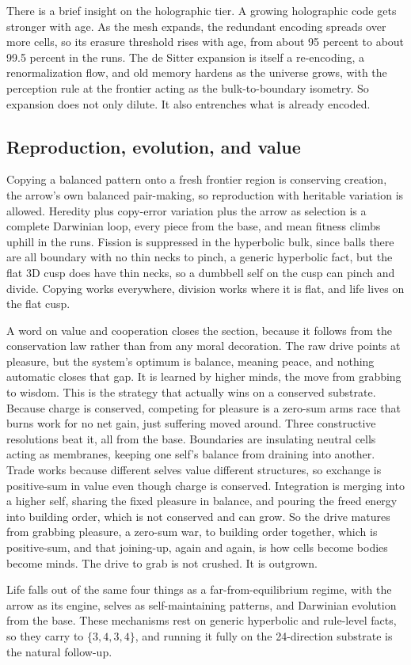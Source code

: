 There is a brief insight on the holographic tier. A growing holographic code gets stronger with age. As the mesh expands, the redundant encoding spreads over more cells, so its erasure threshold rises with age, from about 95 percent to about 99.5 percent in the runs. The de Sitter expansion is itself a re-encoding, a renormalization flow, and old memory hardens as the universe grows, with the perception rule at the frontier acting as the bulk-to-boundary isometry. So expansion does not only dilute. It also entrenches what is already encoded.

\subsection{Reproduction, evolution, and value}

Copying a balanced pattern onto a fresh frontier region is conserving creation, the arrow's own balanced pair-making, so reproduction with heritable variation is allowed. Heredity plus copy-error variation plus the arrow as selection is a complete Darwinian loop, every piece from the base, and mean fitness climbs uphill in the runs. Fission is suppressed in the hyperbolic bulk, since balls there are all boundary with no thin necks to pinch, a generic hyperbolic fact, but the flat 3D cusp does have thin necks, so a dumbbell self on the cusp can pinch and divide. Copying works everywhere, division works where it is flat, and life lives on the flat cusp.

A word on value and cooperation closes the section, because it follows from the conservation law rather than from any moral decoration. The raw drive points at pleasure, but the system's optimum is balance, meaning peace, and nothing automatic closes that gap. It is learned by higher minds, the move from grabbing to wisdom. This is the strategy that actually wins on a conserved substrate. Because charge is conserved, competing for pleasure is a zero-sum arms race that burns work for no net gain, just suffering moved around. Three constructive resolutions beat it, all from the base. Boundaries are insulating neutral cells acting as membranes, keeping one self's balance from draining into another. Trade works because different selves value different structures, so exchange is positive-sum in value even though charge is conserved. Integration is merging into a higher self, sharing the fixed pleasure in balance, and pouring the freed energy into building order, which is not conserved and can grow. So the drive matures from grabbing pleasure, a zero-sum war, to building order together, which is positive-sum, and that joining-up, again and again, is how cells become bodies become minds. The drive to grab is not crushed. It is outgrown.

Life falls out of the same four things as a far-from-equilibrium regime, with the arrow as its engine, selves as self-maintaining patterns, and Darwinian evolution from the base. These mechanisms rest on generic hyperbolic and rule-level facts, so they carry to $\{3,4,3,4\}$, and running it fully on the 24-direction substrate is the natural follow-up.
